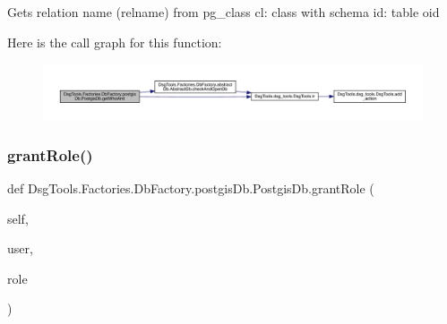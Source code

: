 \begin{DoxyVerb}Gets relation name (relname) from pg_class
cl: class with schema
id: table oid
\end{DoxyVerb}
 Here is the call graph for this function\+:
\nopagebreak
\begin{figure}[H]
\begin{center}
\leavevmode
\includegraphics[width=350pt]{class_dsg_tools_1_1_factories_1_1_db_factory_1_1postgis_db_1_1_postgis_db_a546fb6eb3f9d26674836af52c1e7d0b8_cgraph}
\end{center}
\end{figure}
\mbox{\label{class_dsg_tools_1_1_factories_1_1_db_factory_1_1postgis_db_1_1_postgis_db_a778122593c41cc689833ffe458b92477}} 
\subsubsection{\texorpdfstring{grant\+Role()}{grantRole()}}
{\footnotesize\ttfamily def Dsg\+Tools.\+Factories.\+Db\+Factory.\+postgis\+Db.\+Postgis\+Db.\+grant\+Role (\begin{DoxyParamCaption}\item[{}]{self,  }\item[{}]{user,  }\item[{}]{role }\end{DoxyParamCaption})}

